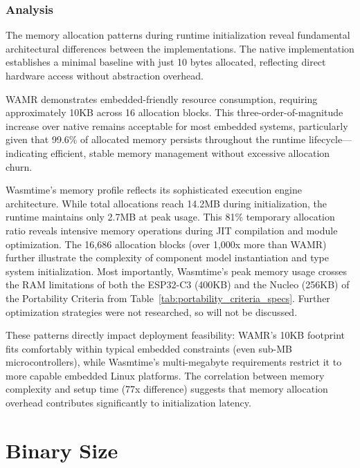 \subsubsection{Analysis}

The memory allocation patterns during runtime initialization reveal fundamental architectural differences between the implementations. The native implementation establishes a minimal baseline with just 10 bytes allocated, reflecting direct hardware access without abstraction overhead.

WAMR demonstrates embedded-friendly resource consumption, requiring approximately 10KB across 16 allocation blocks. This three-order-of-magnitude increase over native remains acceptable for most embedded systems, particularly given that 99.6\% of allocated memory persists throughout the runtime lifecycle—indicating efficient, stable memory management without excessive allocation churn.

Wasmtime's memory profile reflects its sophisticated execution engine architecture. While total allocations reach 14.2MB during initialization, the runtime maintains only 2.7MB at peak usage. This 81\% temporary allocation ratio reveals intensive memory operations during JIT compilation and module optimization. The 16,686 allocation blocks (over 1,000x more than WAMR) further illustrate the complexity of component model instantiation and type system initialization. Most importantly, Wasmtime's peak memory usage crosses the RAM limitations of both the ESP32-C3 (400KB) and the Nucleo (256KB) of the Portability Criteria from Table~\ref{tab:portability_criteria_specs}. Further optimization strategies were not researched, so will not be discussed.

These patterns directly impact deployment feasibility: WAMR's 10KB footprint fits comfortably within typical embedded constraints (even sub-MB microcontrollers), while Wasmtime's multi-megabyte requirements restrict it to more capable embedded Linux platforms. The correlation between memory complexity and setup time (77x difference) suggests that memory allocation overhead contributes significantly to initialization latency.

\section{Binary Size}




